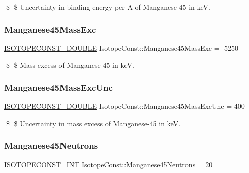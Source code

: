 \$ \$ Uncertainty in binding energy per A of Manganese-\/45 in keV. \mbox{\label{group___isotope_const-_manganese-_mn45_gaf211d7fd19c16428bbe5b62bb7aa494d}} 
\subsubsection{\texorpdfstring{Manganese45\+Mass\+Exc}{Manganese45MassExc}}
{\footnotesize\ttfamily \mbox{\hyperlink{group___isotope_const-_macros_ga8f45a7272ce02c0b4c65c44636ed719a}{I\+S\+O\+T\+O\+P\+E\+C\+O\+N\+S\+T\+\_\+\+D\+O\+U\+B\+LE}} Isotope\+Const\+::\+Manganese45\+Mass\+Exc = -\/5250}

\$ \$ Mass excess of Manganese-\/45 in keV. \mbox{\label{group___isotope_const-_manganese-_mn45_gac4ed1b06eecef4c797afa12196b3fca5}} 
\subsubsection{\texorpdfstring{Manganese45\+Mass\+Exc\+Unc}{Manganese45MassExcUnc}}
{\footnotesize\ttfamily \mbox{\hyperlink{group___isotope_const-_macros_ga8f45a7272ce02c0b4c65c44636ed719a}{I\+S\+O\+T\+O\+P\+E\+C\+O\+N\+S\+T\+\_\+\+D\+O\+U\+B\+LE}} Isotope\+Const\+::\+Manganese45\+Mass\+Exc\+Unc = 400}

\$ \$ Uncertainty in mass excess of Manganese-\/45 in keV. \mbox{\label{group___isotope_const-_manganese-_mn45_ga4ab83dfaf02f199e6476814ac5490f07}} 
\subsubsection{\texorpdfstring{Manganese45\+Neutrons}{Manganese45Neutrons}}
{\footnotesize\ttfamily \mbox{\hyperlink{group___isotope_const-_macros_ga5f18360b3e99483a35c32d789e62621c}{I\+S\+O\+T\+O\+P\+E\+C\+O\+N\+S\+T\+\_\+\+I\+NT}} Isotope\+Const\+::\+Manganese45\+Neutrons = 20}

